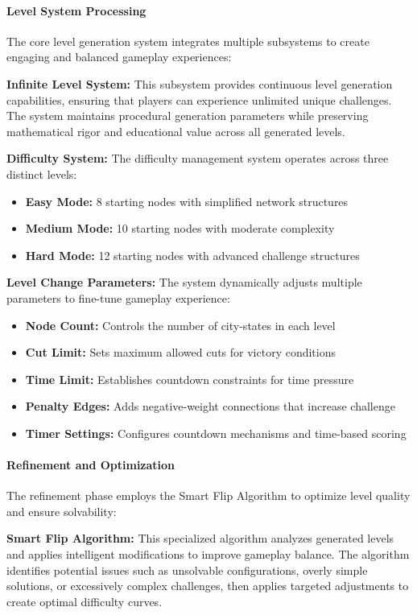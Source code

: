 \documentclass[english]{tudscrreprt}
\begin{document}
\paragraph{Level System Processing}
The core level generation system integrates multiple subsystems to create engaging and balanced gameplay experiences:

\textbf{Infinite Level System:} This subsystem provides continuous level generation capabilities, ensuring that players can experience unlimited unique challenges. The system maintains procedural generation parameters while preserving mathematical rigor and educational value across all generated levels.

\textbf{Difficulty System:} The difficulty management system operates across three distinct levels:
\begin{itemize}
  \item \textbf{Easy Mode:} 8 starting nodes with simplified network structures
  \item \textbf{Medium Mode:} 10 starting nodes with moderate complexity
  \item \textbf{Hard Mode:} 12 starting nodes with advanced challenge structures
\end{itemize}

\textbf{Level Change Parameters:} The system dynamically adjusts multiple parameters to fine-tune gameplay experience:
\begin{itemize}
  \item \textbf{Node Count:} Controls the number of city-states in each level
  \item \textbf{Cut Limit:} Sets maximum allowed cuts for victory conditions
  \item \textbf{Time Limit:} Establishes countdown constraints for time pressure
  \item \textbf{Penalty Edges:} Adds negative-weight connections that increase challenge
  \item \textbf{Timer Settings:} Configures countdown mechanisms and time-based scoring
\end{itemize}

\paragraph{Refinement and Optimization}
The refinement phase employs the Smart Flip Algorithm to optimize level quality and ensure solvability:

\textbf{Smart Flip Algorithm:} This specialized algorithm analyzes generated levels and applies intelligent modifications to improve gameplay balance. The algorithm identifies potential issues such as unsolvable configurations, overly simple solutions, or excessively complex challenges, then applies targeted adjustments to create optimal difficulty curves.
\end{document}
